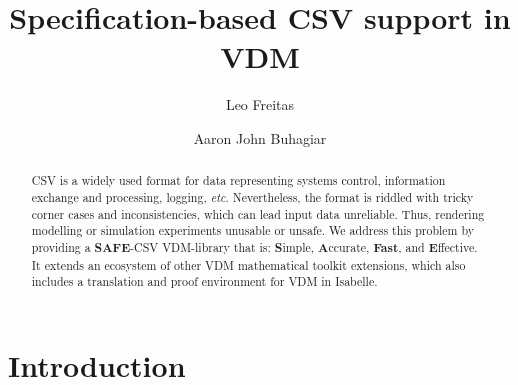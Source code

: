 \documentclass[runningheads,a4paper]{llncs}
\begin{document}
%



\title{Specification-based CSV support in VDM}

\author{Leo Freitas \and Aaron John Buhagiar
}
\authorrunning{ }

			
\maketitle
\setcounter{footnote}{0}
\begin{abstract}
CSV is a widely used format for data representing systems control, information exchange and processing, logging, \textit{etc}. Nevertheless, the format is riddled with tricky corner cases and inconsistencies, which can lead input data unreliable. Thus, rendering modelling or simulation experiments unusable or unsafe. We address this problem by providing a \textbf{SAFE}-CSV VDM-library that is: \textbf{S}imple, \textbf{A}ccurate, \textbf{Fast}, and \textbf{E}ffective. It extends an ecosystem of other VDM mathematical toolkit extensions, which also includes a translation and proof environment for VDM in Isabelle. 
\end{abstract}


\section{Introduction}\label{sec:intro}
\end{document}
